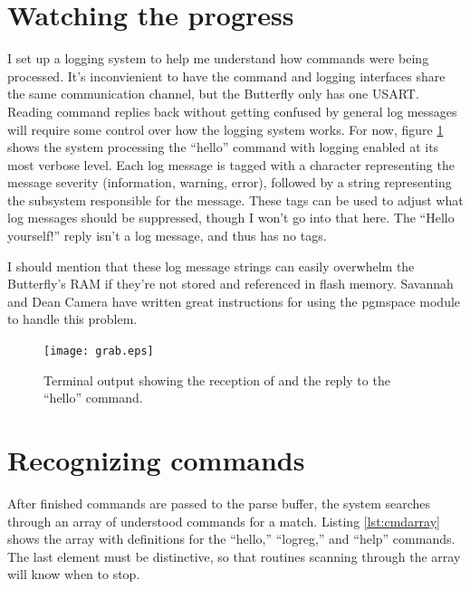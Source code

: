 \clearpage{}
\section{Watching the progress}
I set up a logging system to help me understand how commands were being processed.  It's inconvienient to have the command and logging interfaces share the same communication channel, but the Butterfly only has one USART.  Reading command replies back without getting confused by general log messages will require some control over how the logging system works.  For now, figure \ref{fig:termgrab} shows the system processing the ``hello'' command with logging enabled at its most verbose level.  Each log message is tagged with a character representing the message severity (information, warning, error), followed by a string representing the subsystem responsible for the message.  These tags can be used to adjust what log messages should be suppressed, though I won't go into that here.  The ``Hello yourself!'' reply isn't a log message, and thus has no tags.

I should mention that these log message strings can easily overwhelm the Butterfly's RAM if they're not stored and referenced in flash memory.  Savannah\cite{url:savannah:pgmspace} and Dean Camera\cite{url:deancamera:pgmspace} have written great instructions for using the pgmspace module to handle this problem.

\begin{figure}[ht]
    \begin{center}
        \texttt{[image: grab.eps]}
        \caption{Terminal output showing the reception of and the reply to the ``hello'' command.\label{fig:termgrab}}
    \end{center}
\end{figure}




\clearpage{}
\section{Recognizing commands}
After finished commands are passed to the parse buffer, the system searches through an array of understood commands for a match.  Listing \ref{lst:cmdarray} shows the array with definitions for the ``hello,'' ``logreg,'' and ``help'' commands.    The last element must be distinctive, so that routines scanning through the array will know when to stop.
 

